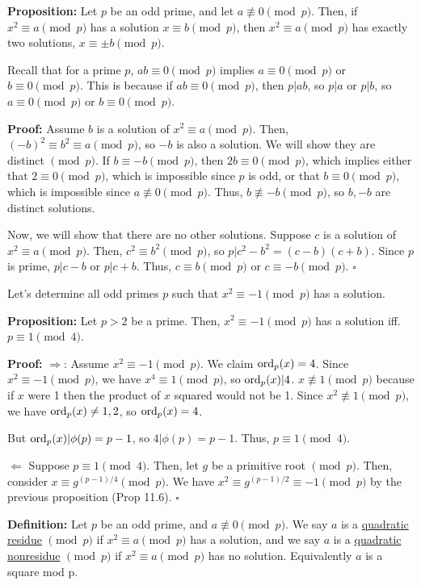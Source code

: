 \documentclass{article}
\newcommand*{\qed}{\hfill$\square$}%
\newenvironment{aside}{\begin{siderules}\setlength{\leftskip}{0.3cm}}{\end{siderules}\setlength{\leftskip}{0pt}}
\begin{document}
\textbf{Proposition:} Let $p$ be an odd prime, and let $a\not\equiv 0\pmod p$. Then, if $x^2\equiv a\pmod p$ has a solution $x\equiv b\pmod p$, then $x^2\equiv a\pmod p$ has exactly two solutions, $x\equiv \pm b\pmod p$. 

\begin{aside}
Recall that for a prime $p$, $ab\equiv 0\pmod p$ implies $a\equiv 0\pmod p$ or $b\equiv 0\pmod p$. This is because if $ab\equiv 0\pmod p$, then $p|ab$, so $p|a$ or $p|b$, so $a\equiv 0\pmod p$ or $b\equiv 0\pmod p$.
\end{aside}

\textbf{Proof:} Assume $b$ is a solution of $x^2\equiv a\pmod p$. Then, $(-b)^2\equiv b^2\equiv a\pmod p$, so $-b$ is also a solution. We will show they are distinct $\pmod p$. If $b\equiv -b\pmod p$, then $2b\equiv 0\pmod p$, which implies either that $2\equiv 0\pmod p$, which is impossible since $p$ is odd, or that $b\equiv 0\pmod p$, which is impossible since $a\not\equiv 0\pmod p$. Thus, $b\not\equiv -b\pmod p$, so $b,-b$ are distinct solutions.

Now, we will show that there are no other solutions. Suppose $c$ is a solution of $x^2\equiv a\pmod p$. Then, $c^2\equiv b^2\pmod p$, so $p|c^2-b^2=(c-b)(c+b)$. Since $p$ is prime, $p|c-b$ or $p|c+b$. Thus, $c\equiv b\pmod p$ or $c\equiv -b\pmod p$. \qed

Let's determine all odd primes $p$ such that $x^2\equiv -1\pmod p$ has a solution. 

\textbf{Proposition:} Let $p>2$ be a prime. Then, $x^2\equiv -1\pmod p$ has a solution iff. $p\equiv 1\pmod 4$.

\textbf{Proof:} $\Rightarrow$: Assume $x^2\equiv -1\pmod p$. We claim $\text{ord}_p(x)=4$. Since $x^2\equiv -1\pmod p$, we have $x^4\equiv 1\pmod p$, so $\text{ord}_p(x)|4$. $x\not\equiv 1\pmod p$ because if $x$ were 1 then the product of $x$ squared would not be 1. Since $x^2\not\equiv 1\pmod p$, we have $\text{ord}_p(x)\neq 1,2$, so $\text{ord}_p(x)=4$. 

But $\text{ord}_p(x)|\phi(p)=p-1$, so $4|\phi(p)=p-1$. Thus, $p\equiv 1\pmod 4$.

$\Leftarrow$ Suppose $p\equiv 1\pmod 4$. Then, let $g$ be a primitive root $\pmod p$. Then, consider $x\equiv g^{(p-1)/4}\pmod p$. We have $x^2\equiv g^{(p-1)/2}\equiv -1\pmod p$ by the previous proposition (Prop 11.6). \qed

\textbf{Definition:} Let $p$ be an odd prime, and $a\not\equiv 0\pmod p$. We say $a$ is a \underline{quadratic residue} $\pmod p$ if $x^2\equiv a\pmod p$ has a solution, and we say $a$ is a \underline{quadratic nonresidue} $\pmod p$ if $x^2\equiv a\pmod p$ has no solution. Equivalently $a$ is a square mod p. 
\end{document}
